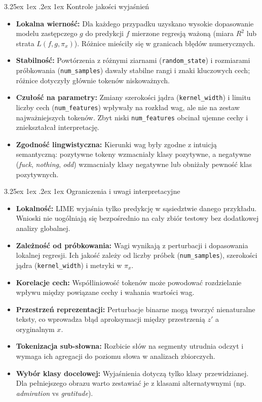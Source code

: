 \documentclass[wmii, inf, mgr]{uwmthesis}
\makeatletter
\renewcommand\paragraph{\@startsection{paragraph}{4}{\z@}%
  {3.25ex \@plus1ex \@minus.2ex}%
  {1ex}%
  {\normalfont\normalsize\bfseries}}
\makeatother
\begin{document}
\paragraph{Kontrole jakości wyjaśnień}
\begin{itemize}
	\item \textbf{Lokalna wierność:} Dla każdego przypadku uzyskano wysokie dopasowanie modelu zastępczego $g$ do predykcji $f$ mierzone regresją ważoną (miara $R^2$ lub strata $L(f,g,\pi_x)$). Różnice mieściły się w granicach błędów numerycznych.
	\item \textbf{Stabilność:} Powtórzenia z różnymi ziarnami (\texttt{random\_state}) i rozmiarami próbkowania (\texttt{num\_samples}) dawały stabilne rangi i znaki kluczowych cech; różnice dotyczyły głównie tokenów niskoważnych.
	\item \textbf{Czułość na parametry:} Zmiany szerokości jądra (\texttt{kernel\_width}) i limitu liczby cech (\texttt{num\_features}) wpływały na rozkład wag, ale nie na zestaw najważniejszych tokenów. Zbyt niski \texttt{num\_features} obcinał ujemne cechy i zniekształcał interpretację.
	\item \textbf{Zgodność lingwistyczna:} Kierunki wag były zgodne z intuicją semantyczną: pozytywne tokeny wzmacniały klasy pozytywne, a negatywne (\textit{fuck}, \textit{nothing}, \textit{odd}) wzmacniały klasy negatywne lub obniżały pewność klas pozytywnych.
\end{itemize}


\paragraph{Ograniczenia i uwagi interpretacyjne}
\begin{itemize}
	\item \textbf{Lokalność:} LIME wyjaśnia tylko predykcję w sąsiedztwie danego przykładu. Wnioski nie uogólniają się bezpośrednio na cały zbiór testowy bez dodatkowej analizy globalnej.
	\item \textbf{Zależność od próbkowania:} Wagi wynikają z perturbacji i dopasowania lokalnej regresji. Ich jakość zależy od liczby próbek (\texttt{num\_samples}), szerokości jądra (\texttt{kernel\_width}) i metryki w $\pi_x$.
	\item \textbf{Korelacje cech:} Współliniowość tokenów może powodować rozdzielanie wpływu między powiązane cechy i wahania wartości wag.
	\item \textbf{Przestrzeń reprezentacji:} Perturbacje binarne mogą tworzyć nienaturalne teksty, co wprowadza błąd aproksymacji między przestrzenią $z'$ a oryginalnym $x$.
	\item \textbf{Tokenizacja sub-słowna:} Rozbicie słów na segmenty utrudnia odczyt i wymaga ich agregacji do poziomu słowa w analizach zbiorczych.
	\item \textbf{Wybór klasy docelowej:} Wyjaśnienia dotyczą tylko klasy przewidzianej. Dla pełniejszego obrazu warto zestawiać je z klasami alternatywnymi (np. \textit{admiration} vs \textit{gratitude}).
\end{itemize}
\end{document}
